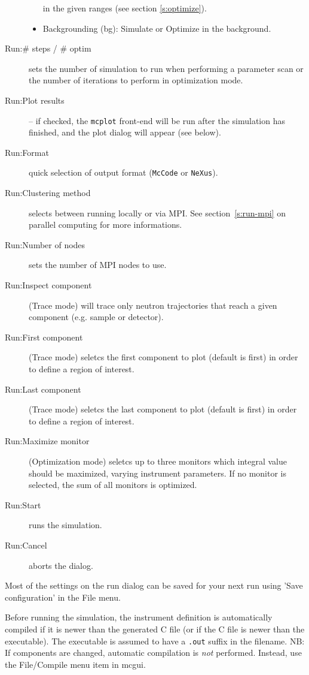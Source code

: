 \begin{description}
\begin{itemize}
    in the given ranges (see section \ref{s:optimize}).
  \item Backgrounding (bg): Simulate or Optimize in the background.
\end{itemize}
\item[Run:\# steps / \# optim] sets the number of simulation to run when
  performing a parameter scan or the number of iterations to
  perform in optimization mode.
\item[Run:Plot results] -- if checked, the \verb+mcplot+ front-end will be run
  after the simulation has finished, and the plot dialog will appear
  (see below).
\item[Run:Format] quick selection of output format (\texttt{McCode} or
  \texttt{NeXus}).
\item[Run:Clustering method] selects between running locally or via MPI.
  See section~\ref{s:run-mpi} on parallel computing for
  more informations.
\item[Run:Number of nodes] sets the number of MPI nodes to use.
\item[Run:Inspect component] (Trace mode) will trace only neutron trajectories
  that reach a given component (e.g. sample or detector).
\item[Run:First component] (Trace mode) seletcs the first component to plot
  (default is first) in order to define a region of interest.
\item[Run:Last component] (Trace mode) seletcs the last component to plot
  (default is first) in order to define a region of interest.
\item[Run:Maximize monitor] (Optimization mode) seletcs up to three monitors
  which integral value should be maximized, varying instrument parameters. If no
  monitor is selected, the sum of all monitors is optimized.
\item[Run:Start] runs the simulation.
\item[Run:Cancel] aborts the dialog.
\end{description}
Most of the settings on the run dialog can be saved for your next
\MCS run using 'Save configuration' in the File menu.

Before running the simulation, the instrument definition is automatically
compiled if it is newer than the generated C file (or if the C file is newer
than the executable). The executable is assumed to have a \verb+.out+ suffix in
the filename. NB: If components are changed, automatic compilation is \emph{not}
performed. Instead, use the File/Compile menu item in mcgui.



